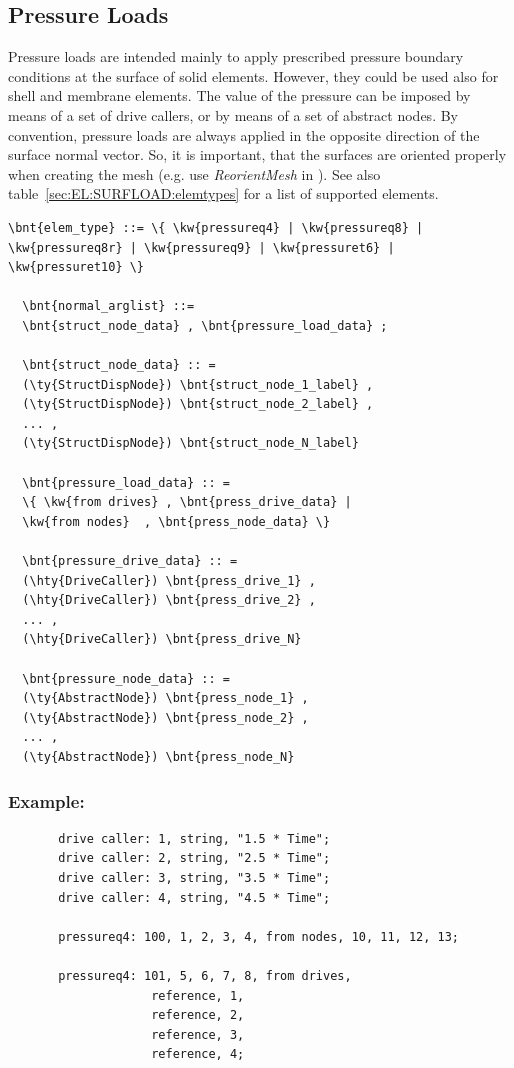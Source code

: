 \subsection{Pressure Loads}
Pressure loads are intended mainly to apply prescribed pressure boundary conditions at the surface of solid elements.
However, they could be used also for shell and membrane elements. The value of the pressure can be imposed
by means of a set of drive callers, or by means of a set of abstract nodes. By convention, pressure loads are always applied
in the opposite direction of the surface normal vector. So, it is important, that the surfaces are oriented properly
when creating the mesh (e.g. use \emph{ReorientMesh} in ).
See also table~\ref{sec:EL:SURFLOAD:elemtypes} for a list of supported elements.
\begin{Verbatim}[commandchars=\\\{\}]
  \bnt{elem_type} ::= \{ \kw{pressureq4} | \kw{pressureq8} | \kw{pressureq8r} | \kw{pressureq9} | \kw{pressuret6} | \kw{pressuret10} \}

  \bnt{normal_arglist} ::=
  \bnt{struct_node_data} , \bnt{pressure_load_data} ;

  \bnt{struct_node_data} :: =
  (\ty{StructDispNode}) \bnt{struct_node_1_label} ,
  (\ty{StructDispNode}) \bnt{struct_node_2_label} ,
  ... ,
  (\ty{StructDispNode}) \bnt{struct_node_N_label}

  \bnt{pressure_load_data} :: =
  \{ \kw{from drives} , \bnt{press_drive_data} |
  \kw{from nodes}  , \bnt{press_node_data} \}

  \bnt{pressure_drive_data} :: =
  (\hty{DriveCaller}) \bnt{press_drive_1} ,
  (\hty{DriveCaller}) \bnt{press_drive_2} ,
  ... ,
  (\hty{DriveCaller}) \bnt{press_drive_N}

  \bnt{pressure_node_data} :: =
  (\ty{AbstractNode}) \bnt{press_node_1} ,
  (\ty{AbstractNode}) \bnt{press_node_2} ,
  ... ,
  (\ty{AbstractNode}) \bnt{press_node_N}

\end{Verbatim}

\subsubsection{Example:}
\begin{verbatim}
       drive caller: 1, string, "1.5 * Time";
       drive caller: 2, string, "2.5 * Time";
       drive caller: 3, string, "3.5 * Time";
       drive caller: 4, string, "4.5 * Time";

       pressureq4: 100, 1, 2, 3, 4, from nodes, 10, 11, 12, 13;

       pressureq4: 101, 5, 6, 7, 8, from drives,
                    reference, 1,
                    reference, 2,
                    reference, 3,
                    reference, 4;
\end{verbatim}

